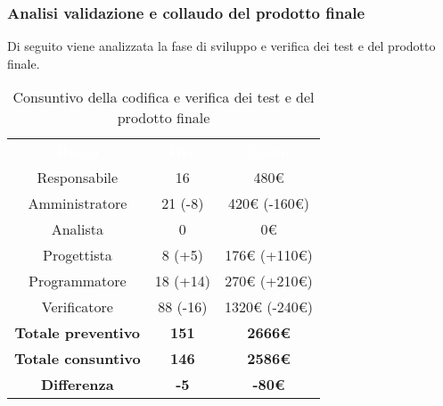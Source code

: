 \subsubsection{Analisi validazione e collaudo del prodotto finale}
Di seguito viene analizzata la fase di sviluppo e verifica dei test e del prodotto finale.
\begin{table}[H]
\centering\renewcommand{\arraystretch}{1.5}
\caption{Consuntivo della codifica e verifica dei test e del prodotto finale}
\vspace{0.2cm}
\begin{tabular}{ c c c }
\rowcolor{redafk}
\textcolor{white}{\textbf{Ruolo}} & \textcolor{white}{\textbf{Ore}} &
\textcolor{white}{\textbf{Costo}}  \\
Responsabile 	& 16 & 480€ \\
Amministratore 	& 21 (-8)  & 420€ (-160€)\\
Analista 		&  0 & 0€ \\
Progettista		&  8 (+5) & 176€ (+110€) \\
Programmatore	&  18 (+14) & 270€ (+210€) \\
Verificatore 	&  88 (-16) & 1320€ (-240€) \\
\textbf{Totale preventivo} & \textbf{151} & \textbf{2666€}  \\
\textbf{Totale consuntivo} &  \textbf{146}& \textbf{2586€} \\
\rowcolor{lastrowcolor}
\textbf{Differenza} & \textbf{-5} & \textbf{-80€} \\
\end{tabular}
\end{table}

